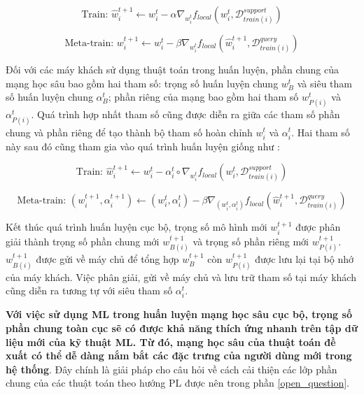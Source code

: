 \begin{dmath}
    \text{Train: } \hat{w}_{i}^{t+1} \gets w_{i}^t - \alpha\nabla_{w_i^t} f_{local}\left(w_{i}^t, \mathcal{D}_{train(i)}^{support}\right)
\end{dmath}

\begin{dmath}
    \text{Meta-train: } w_{i}^{t+1} \gets w_{i}^t - \beta\nabla_{w_i^t} f_{local}\left(\hat{w}_{i}^{t+1}, \mathcal{D}_{train(i)}^{query}\right)
\end{dmath}

Đối với các máy khách sử dụng thuật toán  trong huấn luyện, phần chung của mạng học sâu bao gồm hai tham số: trọng số huấn luyện chung $w_B^{t}$ và siêu tham số huấn luyện chung $\alpha_B^{t}$; phần riêng của mạng bao gồm hai tham số $w_{P(i)}^{t}$ và $\alpha_{P(i)}^{t}$. Quá trình hợp nhất tham số cũng được diễn ra giữa các tham số phần chung và phần riêng để tạo thành bộ tham số hoàn chỉnh $w_i^t$ và $\alpha_i^t$. Hai tham số này sau đó cũng tham gia vào quá trình huấn luyện giống như :

\begin{dmath}
    \text{Train: } \hat{w}_{i}^{t+1} \gets w_{i}^t - \alpha_i^t\circ\nabla_{w_i^t} f_{local}\left(w_{i}^t, \mathcal{D}_{train(i)}^{support}\right)
\end{dmath}

\begin{dmath}
    \text{Meta-train: } (w_{i}^{t+1}, \alpha_i^{t+1}) \gets (w_{i}^t, \alpha_{i}^{t}) - \beta\nabla_{(w_i^t, \alpha_i^t)} f_{local}\left(\hat{w}_{i}^{t+1}, \mathcal{D}_{train(i)}^{query}\right)
\end{dmath}

Kết thúc quá trình huấn luyện cục bộ, trọng số mô hình mới $w_i^{t+1}$ được phân giải thành trọng số phần chung mới $w_{B(i)}^{t+1}$ và trọng số phần riêng mới $w_{P(i)}^{t+1}$. $w_{B(i)}^{t+1}$ được gửi về máy chủ để tổng hợp $w_B^{t+1}$ còn $w_{P(i)}^{t+1}$ được lưu lại tại bộ nhớ của máy khách. Việc phân giải, gửi về máy chủ và lưu trữ tham số tại máy khách cũng diễn ra tương tự với siêu tham số $\alpha_i^t$.

\textbf{Với việc sử dụng ML trong huấn luyện mạng học sâu cục bộ, trọng số phần chung toàn cục sẽ có được khả năng thích ứng nhanh trên tập dữ liệu mới của kỹ thuật ML. Từ đó, mạng học sâu của thuật toán đề xuất có thể dễ dàng nắm bắt các đặc trưng của người dùng mới trong hệ thống}. Đây chính là giải pháp cho câu hỏi về cách cải thiện các lớp phần chung của các thuật toán theo hướng PL được nên trong phần \ref{open_question}.


